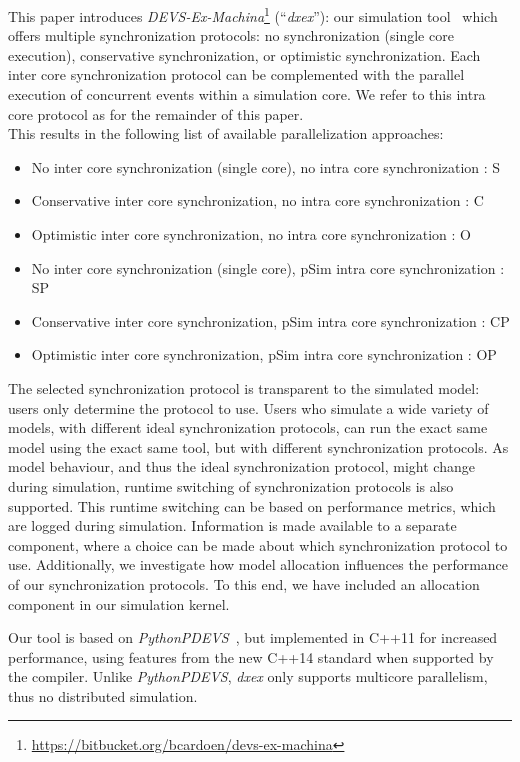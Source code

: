 This paper introduces \textit{DEVS-Ex-Machina}\footnote{\url{https://bitbucket.org/bcardoen/devs-ex-machina}} (``\textit{dxex}''): our simulation tool~\cite{dxex} which offers multiple synchronization protocols: no synchronization (single core execution), conservative synchronization, or optimistic synchronization. Each inter core synchronization protocol can be complemented with the parallel execution of concurrent events within a simulation core. We refer to this intra core protocol as \pSim for the remainder of this paper. \\
This results in the following list of available parallelization approaches:\\
\begin{itemize}
\item No inter core synchronization (single core), no intra core synchronization : S
\item Conservative inter core synchronization, no intra core synchronization : C
\item Optimistic inter core synchronization, no intra core synchronization : O
\item No inter core synchronization (single core), pSim intra core synchronization : SP
\item Conservative inter core synchronization, pSim intra core synchronization : CP
\item Optimistic inter core synchronization, pSim intra core synchronization : OP
\end{itemize}
The selected synchronization protocol is transparent to the simulated model: users only determine the protocol to use.
Users who simulate a wide variety of models, with different ideal synchronization protocols, can run the exact same model using the exact same tool, but with different synchronization protocols.
As model behaviour, and thus the ideal synchronization protocol, might change during simulation, runtime switching of synchronization protocols is also supported.
This runtime switching can be based on performance metrics, which are logged during simulation.
Information is made available to a separate component, where a choice can be made about which synchronization protocol to use. %
Additionally, we investigate how model allocation influences the performance of our synchronization protocols.
To this end, we have included an allocation component in our simulation kernel.

Our tool is based on \textit{PythonPDEVS}~\cite{PythonPDEVS}, but implemented in C++11 for increased performance, using features from the new C++14 standard when supported by the compiler.
Unlike \textit{PythonPDEVS}, \textit{dxex} only supports multicore parallelism, thus no distributed simulation.


